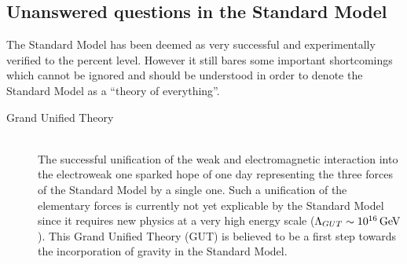 \subsection{Unanswered questions in the Standard Model} \label{sec::QuestionsSM}
The Standard Model has been deemed as very successful and experimentally verified to the percent level. However it still bares some important shortcomings which cannot be ignored and should be understood in order to denote the Standard Model as a ``theory of everything''. 

\begin{myindentpar}
  \begin{description}
    \item[Grand Unified Theory] \hfill \\
    The successful unification of the weak and electromagnetic interaction into the electroweak one sparked hope of one day representing the three forces of the Standard Model by a single one.
    Such a unification of the elementary forces is currently not yet explicable by the Standard Model since it requires new physics at a very high energy scale ($\Lambda_{GUT} \sim 10^{16} \, \mathrm{GeV}$).
    This Grand Unified Theory (GUT) is believed to be a first step towards the incorporation of gravity in the Standard Model.
    

\end{description}
\end{myindentpar}
